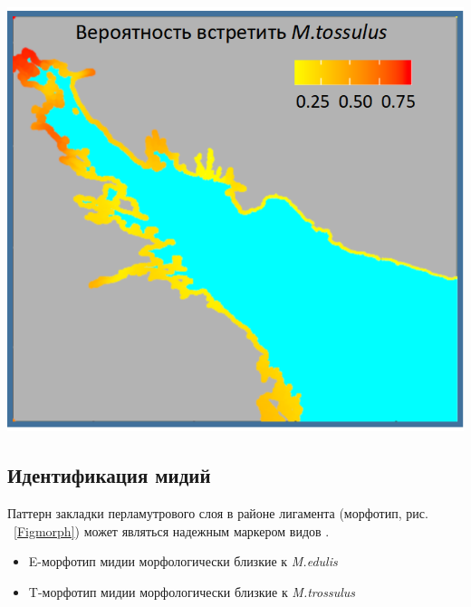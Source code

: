 \documentclass[20pt,a0,portrait]{a0poster}
\begin{document}
\begin{minipage}[t]{0.5\linewidth}
\begin{minipage}[t][10cm][t]{0.4\textwidth}
\end{minipage}\hspace{1cm}
%
\begin{minipage}[t]{0.5\linewidth}
	\begin{center} \vspace{0.1cm}
			\includegraphics[width=0.7\linewidth]{Mytred_distr.png}
			\label{Fig_distred}
		\end{center}\vspace{0.5cm}
\end{minipage}


		\color{DarkSlateGray} %
		
% 
% 


\subsection*{Идентификация мидий}


%
\begin{minipage}[b]{0.4\linewidth}

Паттерн закладки перламутрового слоя в районе лигамента (морфотип, рис. ~\ref{Figmorph}) может являться надежным маркером видов \citep{katolikova2016genetic}.   

\begin{itemize}
  \item E-морфотип мидии морфологически близкие к \emph{M.edulis} 
  \item  T-морфотип мидии морфологически близкие к \emph{M.trossulus}
\end{itemize}
 


\end{minipage}
\end{minipage}
\end{document}
